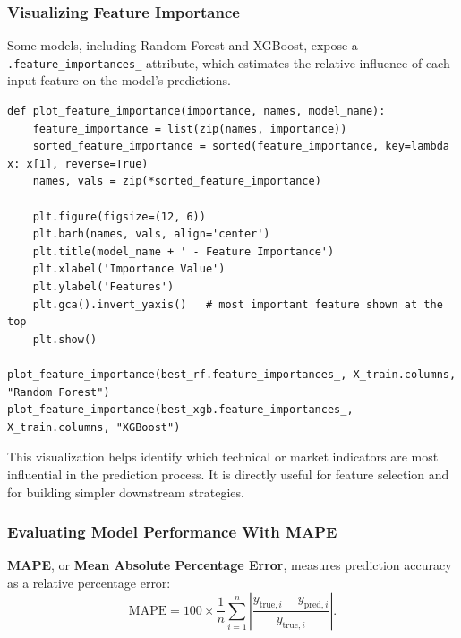 \documentclass[12pt,openany]{book}
\begin{document}
\subsubsection{Visualizing Feature Importance}

Some models, including Random Forest and XGBoost, expose a \texttt{.feature\_importances\_} attribute, which estimates the relative influence of each input feature on the model's predictions.

\begin{Verbatim}[breaklines=true,breakanywhere=true,fontsize=\small]
def plot_feature_importance(importance, names, model_name):
    feature_importance = list(zip(names, importance))
    sorted_feature_importance = sorted(feature_importance, key=lambda x: x[1], reverse=True)
    names, vals = zip(*sorted_feature_importance)

    plt.figure(figsize=(12, 6))
    plt.barh(names, vals, align='center')
    plt.title(model_name + ' - Feature Importance')
    plt.xlabel('Importance Value')
    plt.ylabel('Features')
    plt.gca().invert_yaxis()   # most important feature shown at the top
    plt.show()

plot_feature_importance(best_rf.feature_importances_, X_train.columns, "Random Forest")
plot_feature_importance(best_xgb.feature_importances_, X_train.columns, "XGBoost")
\end{Verbatim}

This visualization helps identify which technical or market indicators are most influential in the prediction process. It is directly useful for feature selection and for building simpler downstream strategies.

\subsubsection{Evaluating Model Performance With MAPE}

\textbf{MAPE}, or \textbf{Mean Absolute Percentage Error}, measures prediction accuracy as a relative percentage error:
\begin{equation*}
    \text{MAPE}
    = 100\times\frac{1}{n}\sum_{i=1}^{n}
      \left|\frac{y_{\text{true},i}-y_{\text{pred},i}}{y_{\text{true},i}}\right|.
\end{equation*}
\end{document}
